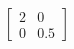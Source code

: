 \documentclass[preview]{standalone}
\begin{document}
\begin{align*}
\begin{bmatrix} 2 & 0 \\ 0 & 0.5 \end{bmatrix}
\end{align*}
\end{document}
